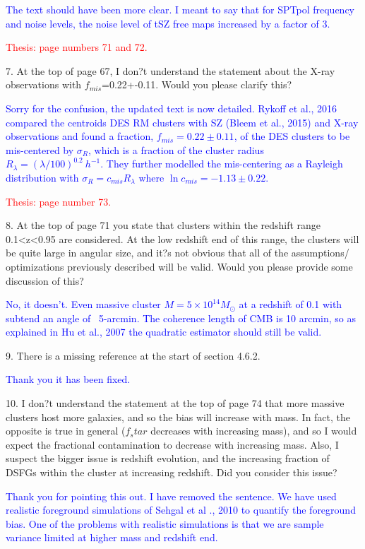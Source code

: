 \documentclass[11pt,a4paper]{article}
\begin{document}
\textcolor{blue}{The text should have been more clear. I meant to say that for SPTpol frequency and noise levels, the noise level of tSZ free maps increased by a factor of 3.}

\textcolor{red}{Thesis: page numbers 71 and 72.}

7. At the top of page 67, I don?t understand the statement about the X-ray
observations with $f_{mis}$=0.22+-0.11. Would you please clarify this?

\textcolor{blue}{Sorry for the confusion, the updated text is now detailed. Rykoff et al., 2016 compared the centroids DES RM clusters with SZ (Bleem et al., 2015) and X-ray observations and found a fraction, $f_{mis} = 0.22 \pm 0.11$, of the DES clusters to be mis-centered by $\sigma_{R}$, which is a fraction of the cluster radius $R_{\lambda} = (\lambda/100)^{0.2} \: h^{-1}$.
They further modelled the mis-centering as a Rayleigh distribution with $\sigma_{R} = c_{mis} R_{\lambda}$ where $\ln c_{mis} = -1.13 \pm 0.22$.}

\textcolor{red}{Thesis: page number 73.}

8. At the top of page 71 you state that clusters within the redshift range 0.1<z<0.95
are considered. At the low redshift end of this range, the clusters will be quite
large in angular size, and it?s not obvious that all of the assumptions/
optimizations previously described will be valid. Would you please provide some
discussion of this?

\textcolor{blue}{No, it doesn't. Even massive cluster $M = 5 \times 10^{14} M_{\odot}$ at a redshift of 0.1 with subtend an angle of ~5-arcmin. The coherence length of CMB is 10 arcmin, so as explained in Hu et al., 2007 the quadratic estimator should still be valid.}

9. There is a missing reference at the start of section 4.6.2.

\textcolor{blue}{Thank you it has been fixed.}

10. I don?t understand the statement at the top of page 74 that more massive clusters
host more galaxies, and so the bias will increase with mass. In fact, the opposite
is true in general ($f_star$ decreases with increasing mass), and so I would expect
the fractional contamination to decrease with increasing mass. Also, I suspect the
bigger issue is redshift evolution, and the increasing fraction of DSFGs within the
cluster at increasing redshift. Did you consider this issue?

\textcolor{blue}{Thank you for pointing this out. I have removed the sentence. We have used realistic foreground simulations of Sehgal et al .,  2010 to quantify the foreground bias. One of the problems with realistic simulations is that we are sample variance limited at higher mass and redshift end. }
\end{document}
